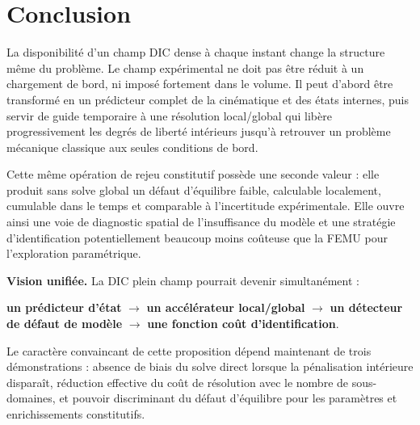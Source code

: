 \documentclass[11pt,a4paper]{article}
\begin{document}
\section{Conclusion}

La disponibilité d'un champ DIC dense à chaque instant change la structure même du problème. Le
champ expérimental ne doit pas être réduit à un chargement de bord, ni imposé fortement dans le
volume. Il peut d'abord être transformé en un prédicteur complet de la cinématique et des états
internes, puis servir de guide temporaire à une résolution local/global qui libère progressivement
les degrés de liberté intérieurs jusqu'à retrouver un problème mécanique classique aux seules
conditions de bord.

Cette même opération de rejeu constitutif possède une seconde valeur : elle produit sans solve
global un défaut d'équilibre faible, calculable localement, cumulable dans le temps et comparable à
l'incertitude expérimentale. Elle ouvre ainsi une voie de diagnostic spatial de l'insuffisance du
modèle et une stratégie d'identification potentiellement beaucoup moins coûteuse que la FEMU pour
l'exploration paramétrique.

\begin{thesisbox}
\textbf{Vision unifiée.} La DIC plein champ pourrait devenir simultanément :
\begin{center}
\textbf{un prédicteur d'état} $\rightarrow$ \textbf{un accélérateur local/global}
$\rightarrow$ \textbf{un détecteur de défaut de modèle}
$\rightarrow$ \textbf{une fonction coût d'identification}.
\end{center}
Le caractère convaincant de cette proposition dépend maintenant de trois démonstrations :
absence de biais du solve direct lorsque la pénalisation intérieure disparaît, réduction effective du
coût de résolution avec le nombre de sous-domaines, et pouvoir discriminant du défaut d'équilibre
pour les paramètres et enrichissements constitutifs.
\end{thesisbox}

\printbibliography
\end{document}
